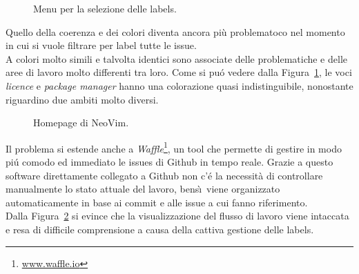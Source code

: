 \documentclass[12pt]{article} %
\begin{document}
\begin{figure}[H]
\caption{Menu per la selezione delle labels.}
\label{fig:cattivoesempio2}
\end{figure}

Quello della coerenza e dei colori diventa ancora pi\`u problematoco nel momento in cui si vuole filtrare per label tutte le issue.\\
A colori molto simili e talvolta identici sono associate delle problematiche e delle aree di lavoro molto differenti tra loro. Come si pu\'o vedere dalla Figura~\ref{fig:cattivoesempio2}, le voci \emph{licence} e \emph{package manager} hanno una colorazione quasi indistinguibile, nonostante riguardino due ambiti molto diversi.

\begin{figure}[H]
\caption{Homepage di NeoVim.}
\label{fig:cattivoesempio3}
\end{figure}

Il problema si estende anche a \emph{Waffle}\footnote{\url{www.waffle.io}}, un tool che permette di gestire in modo pi\'u comodo ed immediato le issues di Github in tempo reale. Grazie a questo software direttamente collegato a Github non c'\'e la necessit\`a di controllare manualmente lo stato attuale del lavoro, bens\`\i\ viene organizzato automaticamente in base ai commit e alle issue a cui fanno riferimento.\\
Dalla Figura~\ref{fig:cattivoesempio3} si evince che la visualizzazione del flusso di lavoro viene intaccata e resa di difficile comprensione a causa della cattiva gestione delle labels.
\end{document}
